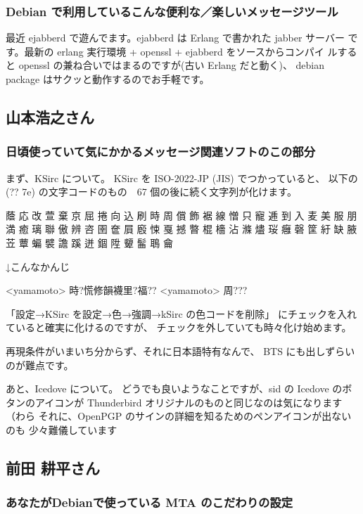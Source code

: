 \documentclass[mingoth,a4paper]{jsarticle}
\begin{document}
\subsubsection{Debian で利用しているこんな便利な／楽しいメッセージツール}
最近 ejabberd で遊んでます。ejabberd は Erlang で書かれた jabber サーバー
です。最新の erlang 実行環境 + openssl + ejabberd をソースからコンパイ
ルすると openssl の兼ね合いではまるのですが(古い Erlang だと動く)、
debian package はサクッと動作するのでお手軽です。


\subsection{山本浩之さん}
\subsubsection{日頃使っていて気にかかるメッセージ関連ソフトのこの部分}

まず、KSirc について。
KSirc を ISO-2022-JP (JIS) でつかっていると、
以下の (?? 7e) の文字コードのもの　67 個の後に続く文字列が化けます。

蔭 応 改 萱 棄 京 屈 捲 向 込 刷 時 周 償 飾 裾 線 憎 只 寵
逓 到 入 麦 美 服 朋 満 癒 璃 聯 傲 辨 咨 圉 奩 屓 廏 悚 戛
撼 暼 棍 檣 沾 滌 燼 珱 癰 磬 筐 紆 缺 腋 苙 蕈 蝙 襞 譫 蹊
迸 錮 陞 顰 髷 鵈 龠

↓こんなかんじ
\begin{commandline}
<yamamoto> 時?慌修韻襪里?福??
<yamamoto> 周???
\end{commandline}

「設定→KSirc を設定→色→強調→kSirc の色コードを削除」
にチェックを入れていると確実に化けるのですが、
チェックを外していても時々化け始めます。

再現条件がいまいち分からず、それに日本語特有なんで、
BTS にも出しずらいのが難点です。

あと、Icedove について。
どうでも良いようなことですが、sid の Icedove のボタンのアイコンが
Thunderbird オリジナルのものと同じなのは気になります（わら
それに、OpenPGP のサインの詳細を知るためのペンアイコンが出ないのも
少々難儀しています

\subsection{前田 耕平さん}
\subsubsection{あなたがDebianで使っている MTA のこだわりの設定}
\end{document}
